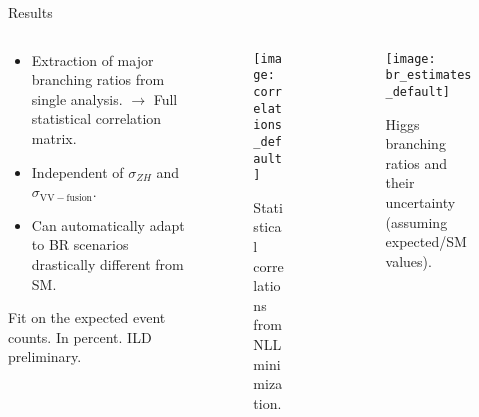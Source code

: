 \begin{block}{Results}
\begin{columns}
\begin{column}{.33\textwidth}

    \begin{itemize}
        \item Extraction of major branching ratios from single analysis.
            $\rightarrow$ Full statistical correlation matrix.
        \item Independent of $\sigma_{ZH}$ and $\sigma_{\mathrm{VV-fusion}}$.
        \item Can automatically adapt to BR scenarios
            drastically different from SM.
    \end{itemize}
    \vspace{\baselineskip}
    \begin{table}
        \caption{Fit on the
            expected event counts. In percent. ILD preliminary.}\label{tab:brs}
    \end{table}
\end{column}
\begin{column}{.33\textwidth}
    \begin{figure}
        \centering\texttt{[image: correlations\_default]}
        \caption{Statistical correlations from NLL minimization.}
        \label{fig:correlations}
    \end{figure}
\end{column}
\begin{column}{.33\textwidth}
    \begin{figure}
        \centering\texttt{[image: br\_estimates\_default]}
        \caption{
            Higgs branching ratios and their uncertainty
            (assuming expected/SM values).
        }
    \end{figure}
\end{column}
\end{columns}
\end{block}
